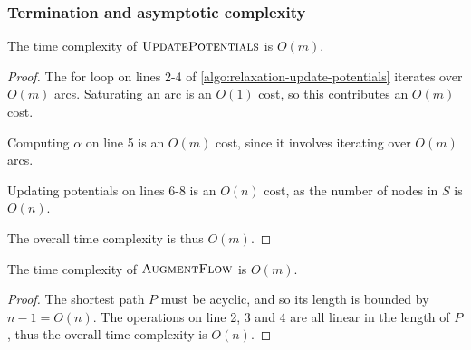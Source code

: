 \subsubsection{Termination and asymptotic complexity}

\begin{lemma} \label{lemma:relax-complexity-updatepotentials}
The time complexity of $\textproc{UpdatePotentials}$ is $O(m)$.
\end{lemma}
\begin{proof}
The for loop on lines 2-4 of \cref{algo:relaxation-update-potentials} iterates over $O(m)$ arcs. Saturating an arc is an $O(1)$ cost, so this contributes an $O(m)$ cost.

Computing $\alpha$ on line 5 is an $O(m)$ cost, since it involves iterating over $O(m)$ arcs\footnotemark.

Updating potentials on lines 6-8 is an $O(n)$ cost, as the number of nodes in $S$ is $O(n)$.

The overall time complexity is thus $O(m)$.
\end{proof}

\begin{lemma} \label{lemma:relax-complexity-augmentflow}
The time complexity of $\textproc{AugmentFlow}$ is $O(m)$.
\end{lemma}
\begin{proof}
The shortest path $P$ must be acyclic, and so its length is bounded by $n-1=O(n)$. The operations on line 2, 3 and 4 are all linear in the length of $P$, thus the overall time complexity is $O(n)$.
\end{proof}

